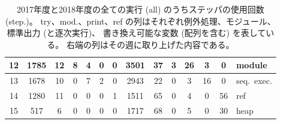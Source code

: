 \begin{table}[h]
\begin{center}
\begin{tabular}{|c||c|c|c|c|c|c||c|c|c|c|c|c||l|}
    12 & 1785 & 12 & 8 & 4 & 0 & 0 & 3501 & 37 & 3 & 26 & 3 & 0 & module\\ \hline
    13 & 1678 & 10 & 0 & 7 & 2 & 0 & 2943 & 22 & 0 & 3 & 16 & 0 & seq.\ exec.\\ \hline
    14 & 1280 & 11 & 0 & 0 & 0 & 1 & 1511 & 65 & 0 & 4 & 0 & 56 & ref\\ \hline
    15 & 517 & 6 & 0 & 0 & 0 & 0 & 1717 & 68 & 0 & 5 & 0 & 30 & heap\\ \hline
  \end{tabular}
\end{center}
  \caption[ステッパが使用された回数]{
    2017年度と2018年度の全ての実行 (all) のうちステッパの使用回数 (step.)。
    try、mod.、print、ref の列はそれぞれ例外処理、モジュール、標準出力 (と逐次実行)、
    書き換え可能な変数 (配列を含む) を表している。
    右端の列はその週に取り上げた内容である。
  }
  \label{TableUsage}
\end{table}

